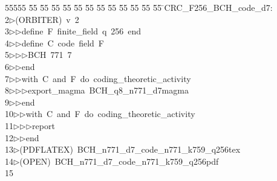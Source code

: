 %
%
\begin{tabbing}
55555 \= 55 \= 55 \= 55 \= 55 \= 55 \= 55 \= 55 \= 55 \= 55 \= 55 \= 55 \= 55 \= \>CRC\_F256\_BCH\_code\_d7:\\[0pt]
2\>$\triangleright$\>(ORBITER)\ v\ 2\ \\[0pt]
3\>$\triangleright$\>$\triangleright$\>define\ F\ finite\_field\ q\ 256\ end\ \\[0pt]
4\>$\triangleright$\>$\triangleright$\>define\ C\ code\ field\ F\ \\[0pt]
5\>$\triangleright$\>$\triangleright$\>$\triangleright$\>BCH\ 771\ 7\ \\[0pt]
6\>$\triangleright$\>$\triangleright$\>end\ \\[0pt]
7\>$\triangleright$\>$\triangleright$\>with\ C\ and\ F\ do\ coding\_theoretic\_activity\ \\[0pt]
8\>$\triangleright$\>$\triangleright$\>$\triangleright$\>export\_magma\ BCH\_q8\_n771\_d7magma\ \\[0pt]
9\>$\triangleright$\>$\triangleright$\>end\ \\[0pt]
10\>$\triangleright$\>$\triangleright$\>with\ C\ and\ F\ do\ coding\_theoretic\_activity\ \\[0pt]
11\>$\triangleright$\>$\triangleright$\>$\triangleright$\>report\ \\[0pt]
12\>$\triangleright$\>$\triangleright$\>end\\[0pt]
13\>$\triangleright$\>(PDFLATEX)\ BCH\_n771\_d7\_code\_n771\_k759\_q256tex\\[0pt]
14\>$\triangleright$\>(OPEN)\ BCH\_n771\_d7\_code\_n771\_k759\_q256pdf\\[0pt]
15\>\end{tabbing}
